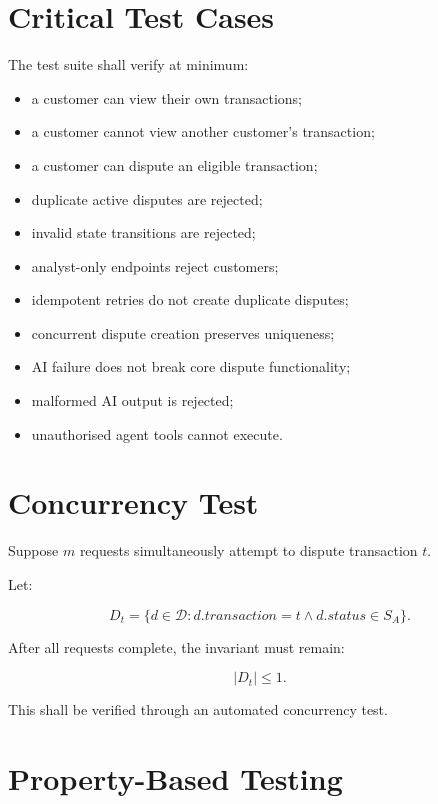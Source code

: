 \documentclass[11pt,a4paper]{article}
\begin{document}
\section{Critical Test Cases}

The test suite shall verify at minimum:

\begin{itemize}
    \item a customer can view their own transactions;
    \item a customer cannot view another customer's transaction;
    \item a customer can dispute an eligible transaction;
    \item duplicate active disputes are rejected;
    \item invalid state transitions are rejected;
    \item analyst-only endpoints reject customers;
    \item idempotent retries do not create duplicate disputes;
    \item concurrent dispute creation preserves uniqueness;
    \item AI failure does not break core dispute functionality;
    \item malformed AI output is rejected;
    \item unauthorised agent tools cannot execute.
\end{itemize}

\section{Concurrency Test}

Suppose \(m\) requests simultaneously attempt to dispute transaction
\(t\).

Let:

\[
D_t
=
\{
d\in\mathcal{D}:d.transaction=t
\land
d.status\in S_A
\}.
\]

After all requests complete, the invariant must remain:

\[
|D_t|\leq1.
\]

This shall be verified through an automated concurrency test.

\section{Property-Based Testing}
\end{document}
